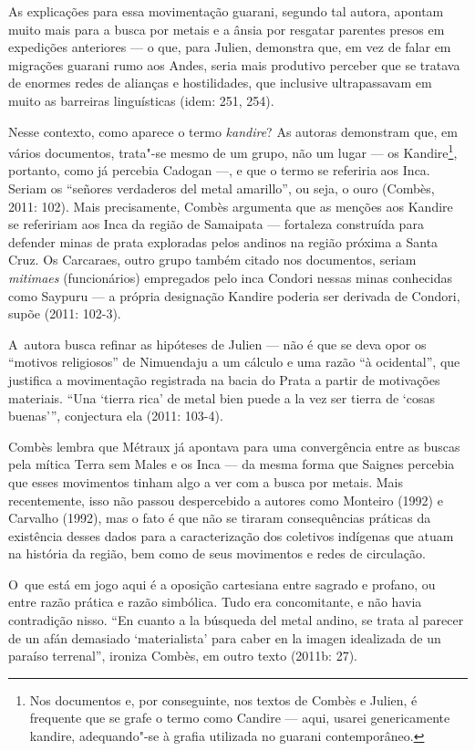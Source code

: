 As explicações para essa movimentação guarani, segundo tal autora,
apontam muito mais para a busca por metais e a ânsia por resgatar
parentes presos em expedições anteriores --- o que, para Julien,
demonstra que, em vez de falar em migrações guarani rumo aos Andes,
seria mais produtivo perceber que se tratava de enormes redes de
alianças e hostilidades, que inclusive ultrapassavam em muito as
barreiras linguísticas (idem: 251, 254).

Nesse contexto, como aparece o termo \emph{kandire}? As autoras demonstram que,
em vários documentos, trata"-se mesmo de um grupo, não um lugar --- os
Kandire\footnote{Nos documentos e, por conseguinte, nos textos de
Combès e Julien, é frequente que se grafe o termo como Candire --- aqui,
usarei genericamente kandire, adequando"-se à grafia utilizada no
guarani contemporâneo.}, portanto, como já percebia Cadogan ---, e que o
termo se referiria aos Inca. Seriam os ``señores verdaderos del metal
amarillo'', ou seja, o ouro (Combès, 2011: 102). Mais precisamente,
Combès argumenta que as menções aos Kandire se refeririam aos Inca da
região de Samaipata --- fortaleza construída para defender minas de prata
exploradas pelos andinos na região próxima a Santa Cruz. Os Carcaraes,
outro grupo também citado nos documentos, seriam \emph{mitimaes}
(funcionários) empregados pelo inca Condori nessas minas conhecidas
como Saypuru --- a própria designação Kandire poderia ser derivada de
Condori, supõe (2011: 102-3).

A~autora busca refinar as hipóteses de Julien --- não é que se deva opor
os ``motivos religiosos'' de Nimuendaju a um cálculo e uma razão ``à
ocidental'', que justifica a movimentação registrada na bacia do Prata a
partir de motivações materiais. ``Una ‘tierra
rica’ de metal bien puede a la vez ser tierra de
‘cosas buenas’'', conjectura ela
(2011: 103-4).

Combès lembra que Métraux já apontava para uma convergência entre as
buscas pela mítica Terra sem Males e os Inca --- da mesma forma que
Saignes percebia que esses movimentos tinham algo a ver com a busca por
metais. Mais recentemente, isso não passou despercebido a autores como
Monteiro (1992) e Carvalho (1992), mas o fato é que não se tiraram
consequências práticas da existência desses dados para a caracterização
dos coletivos indígenas que atuam na história da região, bem como de
seus movimentos e redes de circulação.

O~que está em jogo aqui é a oposição cartesiana entre sagrado e profano,
ou entre razão prática e razão simbólica. Tudo era concomitante, e não
havia contradição nisso. ``En cuanto a la búsqueda del metal andino, se
trata al parecer de un afán demasiado
`materialista' para caber en la
imagen idealizada de un paraíso terrenal'', ironiza Combès, em outro
texto (2011b: 27).

